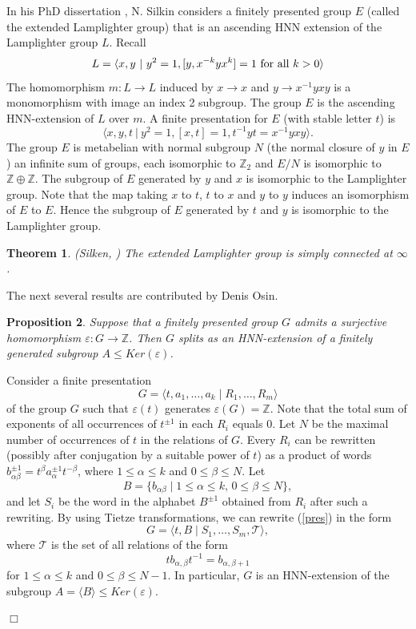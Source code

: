 \documentclass[12pt]{article}
\newtheorem{theorem}{Theorem}[subsection]
\newtheorem{proposition}[theorem]{Proposition}
\newenvironment{proof}{\addvspace{12pt}\noindent{\bf Proof:}}{
$\Box$\par\addvspace{12pt}}
\begin{document}
In his PhD dissertation \cite{Silk1}, N. Silkin considers a finitely presented group $E$ (called the extended Lamplighter group) that is an ascending HNN extension of the Lamplighter group $L$. Recall
$$L=\langle x, y\ |\  y^2=1, [y,x^{-k}yx^k]=1 \hbox{ for all } k>0\rangle$$ 
The homomorphism $m:L\to L$ induced by $x\to x$ and $y\to x^{-1}yxy$ is a monomorphism with image an index 2 subgroup. 
The group $E$ is the ascending HNN-extension of $L$ over $m$. 
A finite presentation for $E$ (with stable letter $t$) is 
$$\langle x,y,t\ |\   y^2=1, [x,t]=1, t^{-1}yt=x^{-1}yxy\rangle.$$ 
The group $E$ is metabelian with normal subgroup $N$ (the normal closure of $y$ in $E$) an infinite sum of groups, each isomorphic to  $\mathbb Z_2$ and $E/N$ is isomorphic to $\mathbb Z\oplus \mathbb Z$.
The subgroup of $E$ generated by $y$ and $x$ is isomorphic to the Lamplighter group. Note that the map taking $x$ to $t$, $t$ to $x$ and $y$ to $y$ induces an isomorphism of $E$ to $E$. Hence the subgroup of $E$ generated by $t$ and $y$ is isomorphic to the Lamplighter group. 

\begin{theorem} (Silken, \cite{Silk1}) \label{SILK1}
The extended Lamplighter group is simply connected at $\infty$. 
\end{theorem}

The next several results are contributed by Denis Osin.

\begin{proposition}  \label{OHNN} 
Suppose that a finitely presented group $G$ admits a surjective homomorphism $\varepsilon \colon G\to \mathbb Z$. Then $G$ splits as an HNN-extension of a finitely generated subgroup $A\leq Ker(\varepsilon)$.
\end{proposition}

\begin{proof}
Consider a finite presentation
\begin{equation}\label{pres}
G=\langle t, a_1, \ldots, a_k\mid R_1, \ldots , R_m\rangle
\end{equation}
of the group $G$ such that $\varepsilon(t)$ generates $\varepsilon(G)=\mathbb Z$.
Note that the total sum of exponents of all occurrences of $t^{\pm 1}$ in each $R_i$ equals $0$. Let $N$ be the maximal number of occurrences of $t$ in the relations of $G$. Every $R_i$ can be rewritten (possibly after conjugation by a suitable power of $t$) as a product of words $b_{\alpha\beta}^{\pm 1}=t^\beta a_\alpha^{\pm 1} t^{-\beta}$, where $1\le \alpha\le k$ and $0 \le \beta\le N$. Let
$$
B=\{b_{\alpha\beta}\mid 1\le \alpha\leq k,\, 0 \leq \beta\leq N\},
$$
and let $S_i$ be the word in the alphabet $B^{\pm 1}$ obtained from $R_i$ after such a rewriting. By using Tietze transformations, we can rewrite (\ref{pres}) in the form
$$
G=\langle t, B \mid S_1, \ldots, S_m, \mathcal T\rangle ,
$$
where $\mathcal T$ is the set of all relations of the form
$$tb_{\alpha, \beta}t^{-1} = b_{\alpha, \beta +1}$$
for $1\leq \alpha\le k$ and $0 \leq \beta\le N-1$.
In particular, $G$ is an HNN-extension of the subgroup $A=\langle B\rangle \le Ker(\varepsilon)$.
\end{proof}
\end{document}
